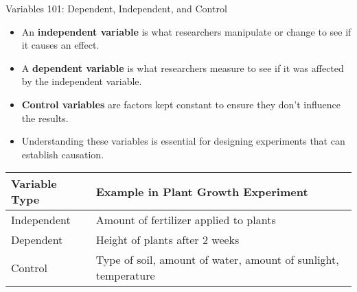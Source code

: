 \documentclass{beamer}
\begin{document}
\begin{frame}{Variables 101: Dependent, Independent, and Control}
    \begin{itemize}
        \item An \textbf{independent variable} is what researchers manipulate or change to see if it causes an effect.
        \item A \textbf{dependent variable} is what researchers measure to see if it was affected by the independent variable.
        \item \textbf{Control variables} are factors kept constant to ensure they don't influence the results.
        \item Understanding these variables is essential for designing experiments that can establish causation.
    \end{itemize}
    
    \begin{table}
        \centering
        \begin{tabular}{|l|p{7cm}|}
            \hline
            \textbf{Variable Type} & \textbf{Example in Plant Growth Experiment} \\
            \hline
            Independent & Amount of fertilizer applied to plants \\
            \hline
            Dependent & Height of plants after 2 weeks \\
            \hline
            Control & Type of soil, amount of water, amount of sunlight, temperature \\
            \hline
        \end{tabular}
    \end{table}
\end{frame}
\end{document}
